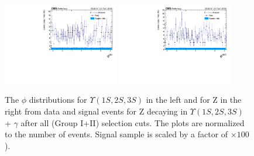 \begin{figure}[!htbp]
\begin{center}
\includegraphics[width=0.45\textwidth]{figures/outputPlots/ZtoUpsilon_Cat0_ZZZZZ/nEvts/data_x_mc/withKinCuts/h_withKin_Upsilon_phi}\hspace*{1.cm}
\includegraphics[width=0.45\textwidth]{figures/outputPlots/ZtoUpsilon_Cat0_ZZZZZ/nEvts/data_x_mc/withKinCuts/h_withKin_Z_phi}
\end{center}\vspace*{-.5cm}
\caption{The $\phi$ distributions for $\Upsilon(1S,2S,3S)$ in the left and for Z in the right from data and signal events for Z decaying in $\Upsilon(1S,2S,3S)$ + $\gamma$ after all (Group I+II) selection cuts. The plots are normalized to the number of events. Signal sample is scaled by a factor of $\times 100$).}
\label{fig:phiUpsilon_and_Z_ZtoUpsilon_Cat0_groupI_plus_II}
\end{figure}



